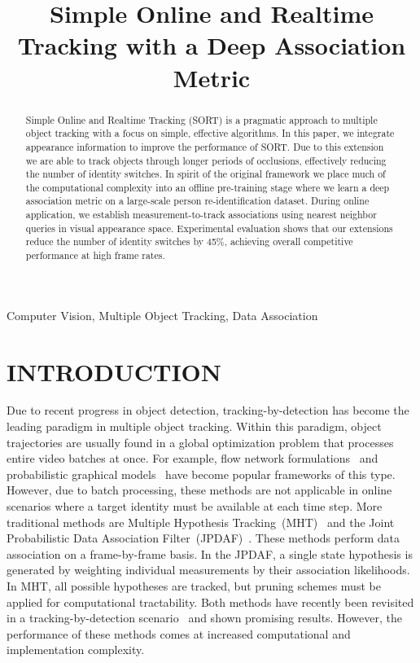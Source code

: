 \documentclass{article}
\title{Simple Online and Realtime Tracking with a Deep Association Metric}
\begin{document}
\maketitle
\begin{abstract}
Simple Online and Realtime Tracking (SORT) is a pragmatic approach to
multiple object tracking with a focus on simple, effective algorithms.
In this paper, we integrate appearance information to improve the performance
of SORT{}.
Due to this extension we are able to track objects through longer periods of
occlusions, effectively reducing the number of identity switches.
In spirit of the original framework we place much of the computational
complexity into an offline pre-training stage where we learn a deep
association metric on a large-scale person re-identification dataset.
During online application, we establish measurement-to-track associations
using nearest neighbor queries in visual appearance space.
Experimental evaluation shows that our extensions reduce the number of identity
switches by 45\%, achieving overall competitive performance at high
frame rates.
\end{abstract}
\begin{keywords}
    Computer Vision,
    Multiple Object Tracking,
Data Association
\end{keywords}
\section{INTRODUCTION}
\label{sec:intro}

Due to recent progress in object detection, tracking-by-detection has become
the leading paradigm in multiple object tracking.
Within this paradigm, object trajectories are usually found in a global
optimization problem that processes entire video batches at once.
For example, flow network formulations~\cite{ZhangLN08, PirsiavashRF11, DBLP:journals/pami/BerclazFTF11}
and probabilistic graphical models~\cite{DBLP:conf/cvpr/YangN12a, DBLP:conf/cvpr/YangN12,
DBLP:conf/cvpr/AndriyenkoSR12, DBLP:conf/cvpr/MilanSR13}
have become popular frameworks of this type.
However, due to batch processing, these methods are not applicable in
online scenarios where a target identity must be available at each time step.
More traditional methods are Multiple Hypothesis Tracking~(MHT)~\cite{Reid79analgorithm} and the Joint Probabilistic Data Association
Filter~(JPDAF)~\cite{fortmann1983sonar}. These methods perform data association
on a frame-by-frame basis.
In the JPDAF, a single state hypothesis is generated by weighting individual
measurements by their association likelihoods. In MHT, all possible
hypotheses are tracked, but pruning schemes must be applied for computational
tractability.
Both methods have recently been revisited in a tracking-by-detection
scenario~\cite{kim2015multiple, hamid2015joint} and shown promising results.
However, the performance of these methods comes at increased computational
and implementation complexity.
\end{document}
